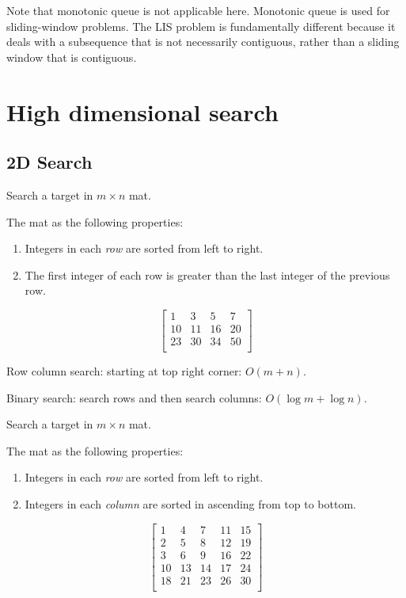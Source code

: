 Note that monotonic queue is not applicable here. Monotonic queue is used for sliding-window problems. The LIS problem is fundamentally different because it deals with a subsequence that is not necessarily contiguous, rather than a sliding window that is contiguous.
\section{High dimensional search}
\subsection{2D Search}
 Search a target in $m\times n$ mat. 

The mat as the following properties: 
\begin{enumerate}
\item Integers in each \textit{row} are sorted from left to right. 
\item The first integer of each row is greater than the last integer of the previous row.
\end{enumerate}
$$
\begin{bmatrix}
1 & 3 & 5 & 7 \\
10 & 11 & 16 & 20 \\
23 & 30 & 34 & 50 \\
\end{bmatrix}
$$

Row column search: starting at top right corner: $O(m+n)$.

Binary search: search rows and then search columns: $O(\log m + \log n)$.


 Search a target in $m\times n$ mat. 

The mat as the following properties: 
\begin{enumerate}
\item Integers in each \textit{row} are sorted from left to right. 
\item Integers in each \textit{column} are sorted in ascending from top to bottom.
\end{enumerate}
$$
\begin{bmatrix}
1&   4&  7& 11& 15 \\
2&   5&  8& 12& 19 \\
3&   6&  9& 16& 22 \\
10& 13& 14& 17& 24 \\
18& 21& 23& 26& 30 \\
\end{bmatrix}
$$ 

